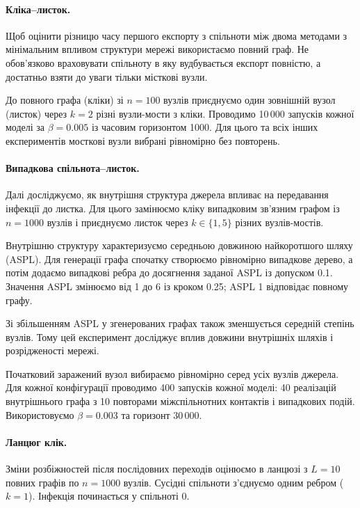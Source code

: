 \documentclass[a4paper,fleqn]{cas-sc}
\begin{document}
\paragraph{Кліка--листок.}
Щоб оцінити різницю часу першого експорту з спільноти між двома методами з мінімальним впливом структури мережі використаємо повний граф. Не обов'язково враховувати спільноту в яку вудбувається експорт повністю, а достатньо взяти до уваги тільки місткові вузли.

До повного графа (кліки) зі $n=100$ вузлів приєднуємо
один зовнішній вузол (листок) через $k=2$
різні вузли-мости з кліки.  Проводимо 10\,000 запусків кожної моделі
за $\beta=0.005$ із часовим горизонтом 1000. Для цього та всіх інших експериментів мосткові вузли вибрані рівномірно
без повторень.

\paragraph{Випадкова спільнота--листок.}
Далі досліджуємо, як внутрішня структура
джерела впливає на передавання інфекції
до листка. Для цього замінюємо кліку
випадковим зв'язним графом із $n=1000$
вузлів і приєднуємо листок через
$k\in\{1,5\}$ різних вузлів-мостів.

Внутрішню структуру характеризуємо
середньою довжиною найкоротшого шляху (ASPL).
Для генерації графа спочатку створюємо
рівномірно випадкове дерево, а потім додаємо
випадкові ребра до досягнення заданої ASPL
із допуском 0.1. Значення ASPL змінюємо
від 1 до 6 із кроком 0.25;
ASPL 1 відповідає повному графу.

Зі збільшенням ASPL у згенерованих графах
також зменшується середній степінь вузлів.
Тому цей експеримент досліджує 
вплив довжини внутрішніх шляхів
і розрідженості мережі.


Початковий заражений вузол вибираємо
рівномірно серед усіх вузлів джерела.
Для кожної конфігурації проводимо
400 запусків кожної моделі:
40 реалізацій внутрішнього графа
з 10 повторами міжспільнотних контактів
і випадкових подій.
Використовуємо $\beta=0.003$
та горизонт 30\,000.




\paragraph{Ланцюг клік.}
Зміни розбіжностей після послідовних
переходів оцінюємо в ланцюзі з $L=10$
повних графів по $n=1000$ вузлів.
Сусідні спільноти з'єднуємо одним ребром
($k=1$).
Інфекція починається у спільноті 0.
\end{document}
